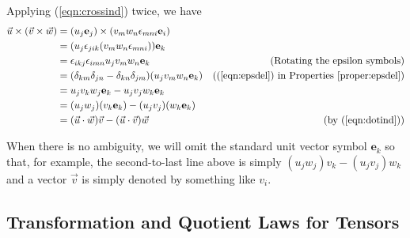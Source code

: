 \begin{solution}
Applying (\ref{eqn:crossind}) twice, we have
\begin{align*}
\vec{u} \times (\vec{v} \times \vec{w}) &= (u_j\textbf{e}_j) \times (v_mw_n\epsilon_{mni}\textbf{e}_i) \\
&= (u_j\epsilon_{jik}(v_mw_n\epsilon_{mni})) \textbf{e}_k \\
&= \epsilon_{ikj}\epsilon_{imn}u_jv_mw_n \textbf{e}_k &\text{(Rotating the epsilon symbols)} \\
&= (\delta_{km}\delta_{jn} - \delta_{kn}\delta_{jm})(u_jv_mw_n \textbf{e}_k) & \text{((\ref{eqn:epsdel}) in Properties \ref{proper:epsdel})} \\
&= u_jv_kw_j \textbf{e}_k - u_jv_jw_k \textbf{e}_k \\
&= (u_jw_j)(v_k\textbf{e}_k) - (u_jv_j)(w_k \textbf{e}_k) \\
&= (\vec{u} \cdot \vec{w})\vec{v} - (\vec{u} \cdot \vec{v})\vec{w} & \text{(by (\ref{eqn:dotind}))}
\end{align*}
\end{solution}
When there is no ambiguity, we will omit the standard unit vector symbol $\textbf{e}_k$ so that, for example, the second-to-last line above is simply $(u_jw_j)v_k - (u_jv_j)w_k$ and a vector $\vec{v}$ is simply denoted by something like $v_i$.

\subsection{Transformation and Quotient Laws for Tensors}

